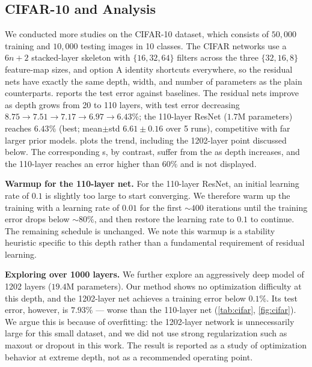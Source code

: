 \subsection{CIFAR-10 and Analysis}
\label{sec:cifar}
We conducted more studies on the CIFAR-10 dataset, which consists of $50{,}000$
training and $10{,}000$ testing images in 10 classes. The CIFAR networks use a
$6n{+}2$ stacked-layer skeleton with $\{16,32,64\}$ filters across the three
$\{32,16,8\}$ feature-map sizes, and option A identity shortcuts everywhere, so
the residual nets have exactly the same depth, width, and number of parameters
as the plain counterparts.  reports the test error against
baselines. The residual nets improve as depth grows from 20 to 110 layers, with
test error decreasing $8.75 \to 7.51 \to 7.17 \to 6.97 \to 6.43\%$; the 110-layer
ResNet ($1.7$M parameters) reaches $6.43\%$ (best; mean$\pm$std $6.61\pm0.16$
over 5 runs), competitive with far larger prior models.  plots
the trend, including the 1202-layer point discussed below. The corresponding
\plainnet{}s, by contrast, suffer from the \degrad{} as depth increases, and the
110-layer \plainnet{} reaches an error higher than $60\%$ and is not displayed.

\noindent\textbf{Warmup for the 110-layer net.}
For the 110-layer ResNet, an initial learning rate of $0.1$ is slightly too
large to start converging. We therefore warm up the training with a learning
rate of $0.01$ for the first $\sim 400$ iterations until the training error drops
below $\sim 80\%$, and then restore the learning rate to $0.1$ to continue. The
remaining schedule is unchanged. We note this warmup is a stability heuristic
specific to this depth rather than a fundamental requirement of residual
learning.

\noindent\textbf{Exploring over 1000 layers.}
We further explore an aggressively deep model of 1202 layers ($19.4$M
parameters). Our method shows no optimization difficulty at this depth, and the
1202-layer net achieves a training error below $0.1\%$. Its test error, however,
is $7.93\%$ --- worse than the 110-layer net (\cref{tab:cifar},
\cref{fig:cifar}). We argue this is because of overfitting: the 1202-layer
network is unnecessarily large for this small dataset, and we did not use strong
regularization such as maxout or dropout in this work. The result is reported
as a study of optimization behavior at extreme depth, not as a recommended
operating point.


